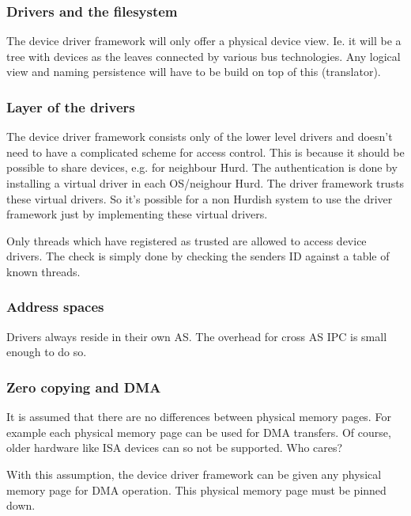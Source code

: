 \documentclass[9pt,a4paper]{extarticle}
\begin{document}
\subsubsection{Drivers and the filesystem}
  
  The device driver framework will only offer a physical device view.
  Ie. it will be a tree with devices as the leaves connected by
  various bus technologies.  Any logical view and naming persistence
  will have to be build on top of this (translator).

\subsubsection{Layer of the drivers}

  The device driver framework consists only of the lower level drivers
  and doesn't need to have a complicated scheme for access control.
  This is because it should be possible to share devices, e.g. for
  neighbour Hurd.  The authentication is done by installing a virtual
  driver in each OS/neighour Hurd.  The driver framework trusts these
  virtual drivers.  So it's possible for a non Hurdish system to use
  the driver framework just by implementing these virtual drivers.
  
  Only threads which have registered as trusted are allowed to access
  device drivers.  The check is simply done by checking the senders
  ID against a table of known threads.

\subsubsection{Address spaces}

  Drivers always reside in their own AS. The overhead for cross AS IPC
  is small enough to do so.

\subsubsection{Zero copying and DMA}
  
  It is assumed that there are no differences between physical memory
  pages. For example each physical memory page can be used for DMA
  transfers. Of course, older hardware like ISA devices can so not be
  supported. Who cares?
  
  With this assumption, the device driver framework can be given any
  physical memory page for DMA operation.  This physical memory page
  must be pinned down.
  
\end{document}
